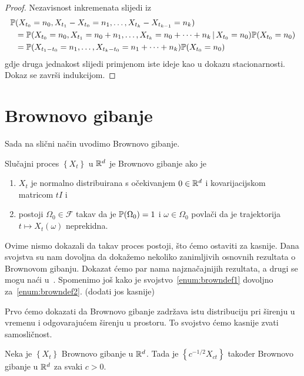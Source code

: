 \documentclass[main.tex]{subfiles}
\begin{document}
\begin{proof}
	Nezavisnost inkremenata slijedi iz
	\begin{equation}
		\begin{aligned}
			\P & (X_{t_0}=n_0, X_{t_1}- X_{t_0} = n_1, \ldots, X_{t_k}-X_{t_{k-1}} = n_k)                                \\
			   & =\P(X_{t_0} = n_0, X_{t_1}=n_0+n_1, \ldots, X_{t_k} = n_0+\cdots+n_k \given X_{t_0}=n_0)\P(X_{t_0}=n_0) \\
			   & =\P(X_{t_1-t_0}=n_1,\ldots,X_{t_k-t_0}=n_1+\cdots+n_k)\P(X_{t_0}=n_0)
		\end{aligned}
	\end{equation}
	gdje druga jednakost slijedi primjenom iste ideje kao u dokazu stacionarnosti. Dokaz se završi indukcijom.
\end{proof}

\section{Brownovo gibanje}\label{sec:sp-brownovo}
Sada na slični način uvodimo Brownovo gibanje.

\begin{definicija} \label{def:brown}
	Slučajni proces \( \left\{ X_t \right\} \) u \( \R^d \) je Brownovo gibanje ako je
	\begin{enumerate}[label=(\roman*)]
		\item \( X_t \) je normalno distribuirana s očekivanjem \( 0 \in \R^d \) i kovarijacijskom matricom \( tI \)  i \label{enum:browndef1}
		\item postoji \( \Omega_0 \in \mathcal F \) takav da je \( \P(\Omega_0)=1 \) i \( \omega \in \Omega_0 \) povlači da je trajektorija \( t \mapsto X_t(\omega) \) neprekidna. \label{enum:browndef2}
	\end{enumerate}
\end{definicija}

Ovime nismo dokazali da takav proces postoji, što ćemo ostaviti za kasnije. Dana svojstva su nam dovoljna da dokažemo nekoliko zanimljivih osnovnih rezultata
o Brownovom gibanju. Dokazat ćemo par nama najznačajnijih rezultata, a drugi se mogu naći u~\cite[]{sato}. Spomenimo još kako je svojstvo~\ref{enum:browndef1}
dovoljno za~\ref{enum:browndef2}. (dodati jos kasnije)

Prvo ćemo dokazati da Brownovo gibanje zadržava istu distribuciju pri širenju u vremenu i odgovarajućem širenju u prostoru. To svojstvo ćemo kasnije zvati
samosličnost.

\begin{teorem} \label{tm:brown-samoslicnost}
	Neka je \( \left\{ X_t \right\} \) Brownovo gibanje u \( \R^d \). Tada je \( \left\{ c^{-1/2}X_{ct} \right\} \) također Brownovo gibanje
	u \( \R^d \) za svaki \( c > 0 \).
\end{teorem}
\end{document}
